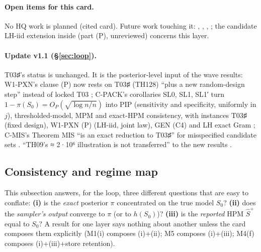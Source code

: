 \paragraph{Open items for this card.} No HQ work is planned (cited card). Future work touching it: , , , ; the candidate LH-iid extension inside  (part (P), unreviewed) concerns this layer.


\paragraph{Update v1.1 (\S\ref{sec:loop}).} T03♯'s status is unchanged. It is the posterior-level input of the wave results: W1-PXN's clause (P) now rests on T03♯ (TH128) ``plus a new random-design step'' instead of locked T03 ; C-PACK's corollaries SL0, SL1, SL1′ turn $1-\pi(S_0)=O_P(\sqrt{\log n/n})$ into PIP (sensitivity and specificity, uniformly in $j$), thresholded-model, MPM and exact-HPM consistency, with instances T03♯ (fixed design), W1-PXN (P) (LH-iid, joint law), GEN (C4) and LH exact Gram ; C-MIS's Theorem MIS ``is an exact reduction to T03♯'' for misspecified candidate sets . ``TH09's ≈ 2·10⁶ illustration is not transferred'' to the new results .

\subsection{Consistency and regime map}\label{sec:theory-regime}

This subsection answers, for the loop, three different questions that are easy to conflate: \textbf{(i)} is the \emph{exact} posterior $\pi$ concentrated on the true model $S_0$? \textbf{(ii)} does the \emph{sampler's output} converge to $\pi$ (or to $h(S_0)$)? \textbf{(iii)} is the \emph{reported} HPM $\hat{S}^{+}$ equal to $S_0$? A result for one layer says nothing about another unless the card composes them explicitly (M1(i) composes (i)+(ii); M5 composes (i)+(iii); M4(f) composes (i)+(iii)+store retention).

